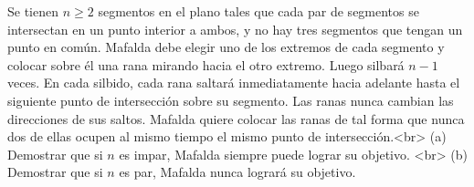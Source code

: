 Se tienen $n \ge 2$ segmentos en el plano tales que cada par de segmentos se intersectan en un punto interior a ambos, y no hay tres segmentos que tengan un punto en común. Mafalda debe elegir uno de los extremos de cada segmento y colocar sobre él una rana mirando hacia el otro extremo. Luego silbará $n−1$ veces. En cada silbido, cada rana saltará inmediatamente hacia adelante hasta el siguiente punto de intersección sobre su segmento. Las ranas nunca cambian las direcciones de sus saltos. Mafalda quiere colocar las ranas de tal forma que nunca dos de ellas ocupen al mismo tiempo el mismo punto de intersección.<br>
(a) Demostrar que si $n$ es impar, Mafalda siempre puede lograr su objetivo. <br>
(b) Demostrar que si $n$ es par, Mafalda nunca logrará su objetivo.
